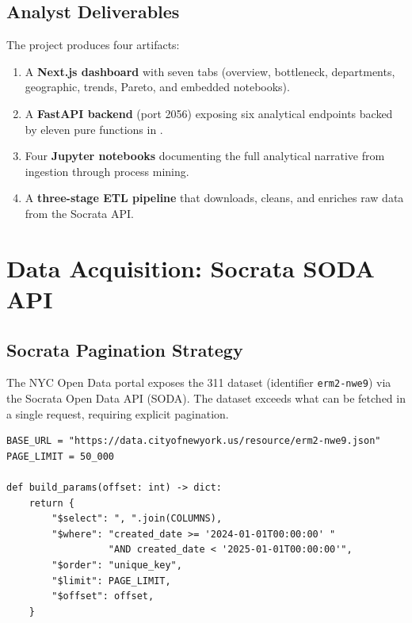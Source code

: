 \subsection{Analyst Deliverables}

The project produces four artifacts:

\begin{enumerate}
  \item A \textbf{Next.js dashboard} with seven tabs (overview, bottleneck, departments, geographic, trends, Pareto, and embedded notebooks).
  \item A \textbf{FastAPI backend} (port 2056) exposing six analytical endpoints backed by eleven pure functions in .
  \item Four \textbf{Jupyter notebooks} documenting the full analytical narrative from ingestion through process mining.
  \item A \textbf{three-stage ETL pipeline} that downloads, cleans, and enriches raw data from the Socrata API.
\end{enumerate}

\section{Data Acquisition: Socrata SODA API}
\label{sec:ops-data-acquisition}


\subsection{Socrata Pagination Strategy}

The NYC Open Data portal exposes the 311 dataset (identifier \texttt{erm2-nwe9}) via the Socrata Open Data API (SODA). The dataset exceeds what can be fetched in a single request, requiring explicit pagination.

\begin{lstlisting}[style=python, caption={Pagination loop in \texttt{01\_download.py}}, label=lst:soda-pagination]
BASE_URL = "https://data.cityofnewyork.us/resource/erm2-nwe9.json"
PAGE_LIMIT = 50_000

def build_params(offset: int) -> dict:
    return {
        "$select": ", ".join(COLUMNS),
        "$where": "created_date >= '2024-01-01T00:00:00' "
                  "AND created_date < '2025-01-01T00:00:00'",
        "$order": "unique_key",
        "$limit": PAGE_LIMIT,
        "$offset": offset,
    }
\end{lstlisting}

